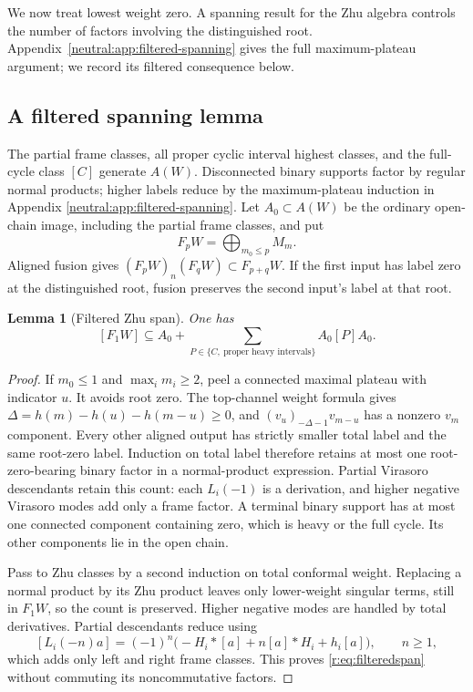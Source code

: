 \documentclass[11pt,a4paper]{article}
\numberwithin{equation}{section}
\newtheorem{lemma}[theorem]{Lemma}
\theoremstyle{definition}\newtheorem{definition}[theorem]{Definition}
\theoremstyle{remark}\newtheorem{remark}[theorem]{Remark}
\begin{document}
We now treat lowest weight zero.  A spanning result for the Zhu
algebra controls the number of factors involving the distinguished
root.  Appendix~\ref{neutral:app:filtered-spanning} gives the full
maximum-plateau argument; we record its filtered consequence below.

\subsection{A filtered spanning lemma}

The partial frame classes, all proper cyclic interval highest
classes, and the full-cycle class \([C]\) generate \(A(W)\).
Disconnected binary supports factor by regular normal products;
higher labels reduce by the maximum-plateau induction in
Appendix \ref{neutral:app:filtered-spanning}.
Let \(A_0\subset A(W)\) be the ordinary open-chain image, including
the partial frame classes, and put
\[
                 F_pW=\bigoplus_{m_0\le p}M_m.
\]
Aligned fusion gives \((F_pW)_n(F_qW)\subset F_{p+q}W\).
If the first input has label zero at the distinguished root, fusion
preserves the second input's label at that root.

\begin{lemma}[Filtered Zhu span]\label{r:lem:filtered}
One has
\begin{equation}\label{r:eq:filteredspan}
 [F_1W]\subseteq A_0+
 \sum_{P\in\{C,\ \text{proper heavy intervals}\}}A_0[P]A_0.
\end{equation}
\end{lemma}

\begin{proof}
If \(m_0\le1\) and \(\max_i m_i\ge2\), peel a connected
maximal plateau with indicator \(u\). It avoids root zero.
The top-channel weight formula gives
\(\Delta=h(m)-h(u)-h(m-u)\ge0\), and
\((v_u)_{-\Delta-1}v_{m-u}\) has a nonzero \(v_m\) component.
Every other aligned output has strictly smaller total label and
the same root-zero label. Induction on total label therefore
retains at most one root-zero-bearing binary factor in a
normal-product expression. Partial Virasoro descendants retain
this count: each \(L_i(-1)\) is a derivation, and higher negative
Virasoro modes add only a frame factor. A terminal binary support
has at most one connected component containing zero, which is
heavy or the full cycle. Its other components lie in the open chain.

Pass to Zhu classes by a second induction on total conformal
weight. Replacing a normal product by its Zhu product leaves only
lower-weight singular terms, still in \(F_1W\), so the count is
preserved. Higher negative modes are handled by total derivatives.
Partial descendants reduce using
\[
 [L_i(-n)a]=(-1)^n\bigl(-H_i*[a]+n[a]*H_i+h_i[a]\bigr),
 \qquad n\ge1,
\]
which adds only left and right frame classes. This proves
\eqref{r:eq:filteredspan} without commuting its noncommutative factors.
\end{proof}
\end{document}
